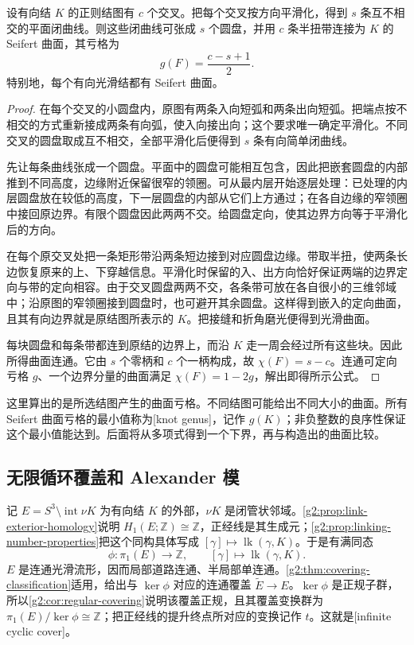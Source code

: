 \begin{proposition}[Seifert 算法]\label{g2:prop:seifert-algorithm}
	设有向结 \(K\) 的正则结图有 \(c\) 个交叉。把每个交叉按方向平滑化，得到 \(s\) 条互不相交的平面闭曲线。则这些闭曲线可张成 \(s\) 个圆盘，并用 \(c\) 条半扭带连接为 \(K\) 的 Seifert 曲面，其亏格为
	\begin{equation}\label{g2:eq:seifert-algorithm-genus}
		g(F)=\frac{c-s+1}{2}.
	\end{equation}
	特别地，每个有向光滑结都有 Seifert 曲面。
\end{proposition}
\begin{proof}
	在每个交叉的小圆盘内，原图有两条入向短弧和两条出向短弧。把端点按不相交的方式重新接成两条有向弧，使入向接出向；这个要求唯一确定平滑化。不同交叉的圆盘取成互不相交，全部平滑化后便得到 \(s\) 条有向简单闭曲线。

	先让每条曲线张成一个圆盘。平面中的圆盘可能相互包含，因此把嵌套圆盘的内部推到不同高度，边缘附近保留很窄的领圈。可从最内层开始逐层处理：已处理的内层圆盘放在较低的高度，下一层圆盘的内部从它们上方通过；在各自边缘的窄领圈中接回原边界。有限个圆盘因此两两不交。给圆盘定向，使其边界方向等于平滑化后的方向。

	在每个原交叉处把一条矩形带沿两条短边接到对应圆盘边缘。带取半扭，使两条长边恢复原来的上、下穿越信息。平滑化时保留的入、出方向恰好保证两端的边界定向与带的定向相容。由于交叉圆盘两两不交，各条带可放在各自很小的三维邻域中；沿原图的窄领圈接到圆盘时，也可避开其余圆盘。这样得到嵌入的定向曲面，且其有向边界就是原结图所表示的 \(K\)。把接缝和折角磨光便得到光滑曲面。

	每块圆盘和每条带都连到原结的边界上，而沿 \(K\) 走一周会经过所有这些块。因此所得曲面连通。它由 \(s\) 个零柄和 \(c\) 个一柄构成，故 \(\chi(F)=s-c\)。连通可定向亏格 \(g\)、一个边界分量的曲面满足 \(\chi(F)=1-2g\)，解出即得所示公式。
\end{proof}

这里算出的是所选结图产生的曲面亏格。不同结图可能给出不同大小的曲面。所有 Seifert 曲面亏格的最小值称为[knot genus]，记作 \(g(K)\)；非负整数的良序性保证这个最小值能达到。后面将从多项式得到一个下界，再与构造出的曲面比较。

\subsection{无限循环覆盖和 Alexander 模}
\label{g2:subsec:A02:02}

记 \(E=S^3\setminus\operatorname{int}\nu K\) 为有向结 \(K\) 的外部，\(\nu K\) 是闭管状邻域。\cref{g2:prop:link-exterior-homology}说明 \(H_1(E;\mathbb Z)\cong\mathbb Z\)，正经线是其生成元；\cref{g2:prop:linking-number-properties}把这个同构具体写成 \([\gamma]\mapsto\operatorname{lk}(\gamma,K)\)。于是有满同态
\[
	\phi:\pi_1(E)\longrightarrow\mathbb Z,
	\qquad[\gamma]\longmapsto\operatorname{lk}(\gamma,K).
\]
\(E\) 是连通光滑流形，因而局部道路连通、半局部单连通。\cref{g2:thm:covering-classification}适用，给出与 \(\ker\phi\) 对应的连通覆盖 \(\widetilde E\to E\)。\(\ker\phi\) 是正规子群，所以\cref{g2:cor:regular-covering}说明该覆盖正规，且其覆盖变换群为 \(\pi_1(E)/\ker\phi\cong\mathbb Z\)；把正经线的提升终点所对应的变换记作 \(t\)。这就是[infinite cyclic cover]。

